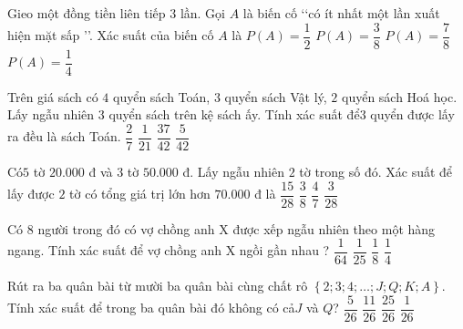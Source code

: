 \begin{ex}
Gieo một đồng tiền liên tiếp $3$ lần. Gọi $A$ là biến cố \lq\lq có ít nhất một lần xuất hiện mặt sấp \rq\rq . Xác suất của biến cố $A$ là
\choice
{$P(A)=\dfrac{1}{2}$}
{$P(A)=\dfrac{3}{8}$}
{\True $P(A)=\dfrac{7}{8}$}
{$P(A)=\dfrac{1}{4}$}
\end{ex}
\begin{ex}
Trên giá sách có $4$ quyển sách Toán, $3$ quyển sách Vật lý, $2$ quyển sách Hoá học. Lấy ngẫu nhiên $3$ quyển sách trên kệ sách ấy. Tính xác suất để$3$ quyển được lấy ra đều là sách Toán.
\choice
{$\dfrac{2}{7}$}
{\True $\dfrac{1}{21}$}
{$\dfrac{37}{42}$}
{$\dfrac{5}{42}$}
\end{ex}
\begin{ex}
Có$5$ tờ $20.000$ đ và 3 tờ $50.000$ đ. Lấy ngẫu nhiên $2$ tờ trong số đó. Xác suất để lấy được $2$ tờ có tổng giá trị lớn hơn $70.000$ đ là
\choice
{$\dfrac{15}{28}$}
{$\dfrac{3}{8}$}
{$\dfrac{4}{7}$}
{\True $\dfrac{3}{28}$}
\end{ex}
\begin{ex}
Có $8$ người trong đó có vợ chồng anh X được xếp ngẫu nhiên theo một hàng ngang. Tính xác suất để vợ chồng anh X ngồi gần nhau ?
\choice
{$\dfrac{1}{64}$}
{$\dfrac{1}{25}$}
{$\dfrac{1}{8}$}
{\True $\dfrac{1}{4}$}
\end{ex}
\begin{ex}
Rút ra ba quân bài từ mười ba quân bài cùng chất rô $\left\{ 2;3;4;\ldots ;J;Q;K;A \right\}$. Tính xác suất để trong ba quân bài đó không có cả$J$ và $Q$?
\choice
{$\dfrac{5}{26}$}
{$\dfrac{11}{26}$}
{\True $\dfrac{25}{26}$}
{$\dfrac{1}{26}$}
\end{ex}
